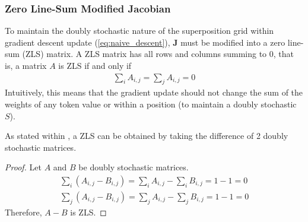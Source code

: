 \subsubsection{Zero Line-Sum Modified Jacobian}%
\label{ssub:zero_line_sum_modified_jacobian}
To maintain the doubly stochastic nature of the superposition grid within gradient descent update (\autoref{eq:naive_descent}), $\bm{J}$ must be modified into a zero line-sum (ZLS) matrix.\cite{zeroLineSum} A ZLS matrix has all rows and columns summing to 0, that is, a matrix $A$ is ZLS if and only if
\begin{align}
    \sum_i A_{i,j}=\sum_j A_{i,j}=0
\end{align}
Intuitively, this means that the gradient update should not change the sum of the weights of any token value or within a position (to maintain a doubly stochastic $S$).

As stated within \cite{zeroLineSum}, a ZLS can be obtained by taking the difference of 2 doubly stochastic matrices.
\begin{proof}
    Let $A$ and $B$ be doubly stochastic matrices.
    \begin{align}
        \sum_i \left(A_{i,j}-B_{i,j}\right)= \sum_i A_{i,j}-\sum_i B_{i,j}=1-1=0\nonumber\\
        \sum_j \left(A_{i,j}-B_{i,j}\right)= \sum_j A_{i,j}-\sum_j B_{i,j}=1-1=0
    \end{align}
    Therefore, $A-B$ is ZLS.
\end{proof}

